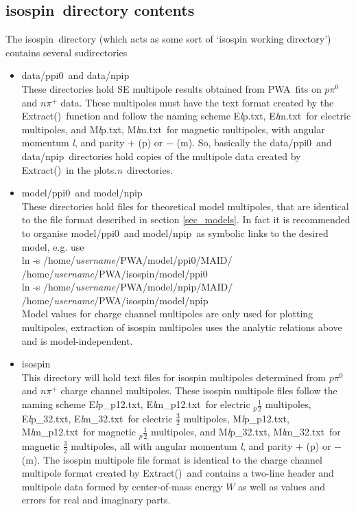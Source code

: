 \documentclass[a4paper,10pt]{article}
\def\PWA{\ttfamily PWA\rmfamily\ }
\def\tt{\ttfamily}
\def\rm{\rmfamily}
\begin{document}
\subsection{\tt isospin\rm\ directory contents}

The \tt isospin\rm\ directory (which acts as some sort of `isospin working directory') contains several sudirectories
\begin{itemize}
\item
\tt data/ppi0\rm\ and \tt data/npip\rm\\
These directories hold SE multipole results obtained from \PWA fits on $p\pi^0$ and $n\pi^+$ data. These multipoles
must have the text format created by the \tt Extract()\rm\ function and follow the naming scheme
\tt E\textit{l}p.txt\rm,
\tt E\textit{l}m.txt\rm\ 
for electric multipoles, and
\tt M\textit{l}p.txt\rm,
\tt M\textit{l}m.txt\rm\ 
for magnetic multipoles, with angular momentum \tt\textit{l}\rm, and parity
$+$ (\tt p\rm) or $-$ (\tt m\rm).
So, basically the \tt data/ppi0\rm\ and \tt data/npip\rm\ directories hold copies of the multipole data created
by \tt Extract()\rm\ in the \tt plots.\textit{n}\rm\ directories.
\item
\tt model/ppi0\rm\ and \tt model/npip\rm\\
These directories hold files for theoretical model multipoles, that are identical to the file format described in section
\ref{sec_models}. In fact it is recommended to organise \tt model/ppi0\rm\ and \tt model/npip\rm\ as
symbolic links to the desired model, e.g. use\\
\tt ln -s /home/\textit{username}/PWA/model/ppi0/MAID/ /home/\textit{username}/PWA/isospin/model/ppi0\rm\\
\tt ln -s /home/\textit{username}/PWA/model/npip/MAID/ /home/\textit{username}/PWA/isospin/model/npip\rm\\
Model values for charge channel multipoles are only used for plotting multipoles, extraction
of isospin multipoles uses the analytic relations above and is model-independent.
\item 
\tt isospin\rm\\
This directory will hold text files for isospin multipoles determined from $p\pi^0$ and $n\pi^+$ charge
channel multipoles. These isospin multipole files follow the naming scheme
\tt E\textit{l}p\_p12.txt\rm,
\tt E\textit{l}m\_p12.txt\rm\ 
for electric $_p\frac{1}{2}$ multipoles,
\tt E\textit{l}p\_32.txt\rm,
\tt E\textit{l}m\_32.txt\rm\ 
for electric $\frac{3}{2}$ multipoles,
\tt M\textit{l}p\_p12.txt\rm,
\tt M\textit{l}m\_p12.txt\rm\ 
for magnetic $_p\frac{1}{2}$ multipoles, and
\tt M\textit{l}p\_32.txt\rm,
\tt M\textit{l}m\_32.txt\rm\ 
for magnetic $\frac{3}{2}$ multipoles,
all with angular momentum \tt\textit{l}\rm, and parity
$+$ (\tt p\rm) or $-$ (\tt m\rm).
The isospin multipole file format is identical to the charge channel multipole format created by \tt Extract()\rm\
and contains a two-line header and multipole data formed by
center-of-mass energy $W$ as well as values and errors for real and imaginary parts.

\end{itemize}
\end{document}
